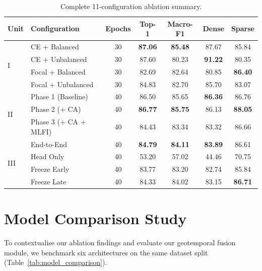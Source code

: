 \documentclass[11pt]{article}
\begin{document}
\begin{table}[H]
\centering
\caption{Complete 11-configuration ablation summary.}
\label{tab:master}
\small
\begin{tabular}{@{}llccccc@{}}
\toprule
\textbf{Unit} & \textbf{Configuration} & \textbf{Epochs} & \textbf{Top-1} & \textbf{Macro-F1} & \textbf{Dense} & \textbf{Sparse} \\
\midrule
\multirow{4}{*}{I}
  & CE + Balanced       & 30 & \textbf{87.06} & \textbf{85.48} & 87.67 & 85.84 \\
  & CE + Unbalanced     & 30 & 87.60 & 80.23 & \textbf{91.22} & 80.35 \\
  & Focal + Balanced    & 30 & 82.69 & 82.64 & 80.85 & \textbf{86.40} \\
  & Focal + Unbalanced  & 30 & 84.83 & 82.70 & 85.70 & 83.07 \\
\midrule
\multirow{3}{*}{II}
  & Phase 1 (Baseline)    & 40 & 86.50 & 85.65 & \textbf{86.36} & 86.76 \\
  & Phase 2 (+ CA)        & 40 & \textbf{86.77} & \textbf{85.75} & 86.13 & \textbf{88.05} \\
  & Phase 3 (+ CA + MLFI) & 40 & 84.43 & 83.34 & 83.32 & 86.66 \\
\midrule
\multirow{4}{*}{III}
  & End-to-End      & 40 & \textbf{84.79} & \textbf{84.11} & \textbf{83.89} & 86.61 \\
  & Head Only       & 40 & 53.20 & 57.02 & 44.46 & 70.75 \\
  & Freeze Early    & 40 & 83.77 & 83.20 & 82.74 & 85.84 \\
  & Freeze Late     & 40 & 84.33 & 84.02 & 83.15 & \textbf{86.71} \\
\bottomrule
\end{tabular}
\end{table}

\section{Model Comparison Study}

To contextualise our ablation findings and evaluate our geotemporal fusion module, we benchmark six architectures on the same dataset split (Table~\ref{tab:model_comparison}).
\end{document}
